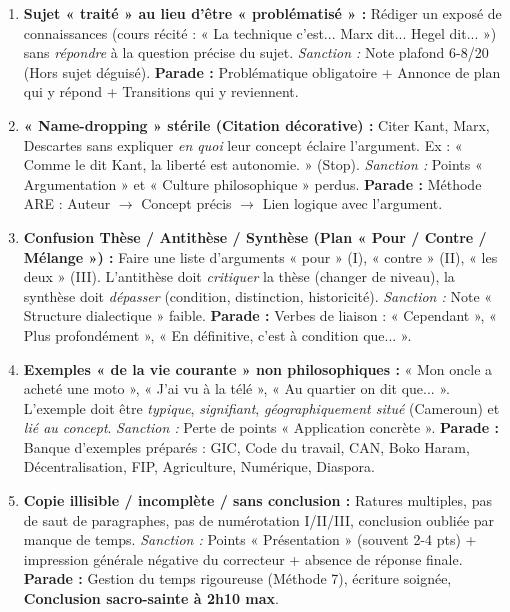 \documentclass[11pt]{article}
\begin{document}
\begin{attention}
\begin{enumerate}
    \item \textbf{Sujet « traité » au lieu d'être « problématisé » :} Rédiger un exposé de connaissances (cours récité : « La technique c'est... Marx dit... Hegel dit... ») sans \emph{répondre} à la question précise du sujet. \emph{Sanction :} Note plafond 6-8/20 (Hors sujet déguisé). \textbf{Parade :} Problématique obligatoire + Annonce de plan qui y répond + Transitions qui y reviennent.
    \item \textbf{« Name-dropping » stérile (Citation décorative) :} Citer Kant, Marx, Descartes sans expliquer \emph{en quoi} leur concept éclaire l'argument. Ex : « Comme le dit Kant, la liberté est autonomie. » (Stop). \emph{Sanction :} Points « Argumentation » et « Culture philosophique » perdus. \textbf{Parade :} Méthode ARE : Auteur $\rightarrow$ Concept précis $\rightarrow$ Lien logique avec l'argument.
    \item \textbf{Confusion Thèse / Antithèse / Synthèse (Plan « Pour / Contre / Mélange ») :} Faire une liste d'arguments « pour » (I), « contre » (II), « les deux » (III). L'antithèse doit \emph{critiquer} la thèse (changer de niveau), la synthèse doit \emph{dépasser} (condition, distinction, historicité). \emph{Sanction :} Note « Structure dialectique » faible. \textbf{Parade :} Verbes de liaison : « Cependant », « Plus profondément », « En définitive, c'est à condition que... ».
    \item \textbf{Exemples « de la vie courante » non philosophiques :} « Mon oncle a acheté une moto », « J'ai vu à la télé », « Au quartier on dit que... ». L'exemple doit être \emph{typique}, \emph{signifiant}, \emph{géographiquement situé} (Cameroun) et \emph{lié au concept}. \emph{Sanction :} Perte de points « Application concrète ». \textbf{Parade :} Banque d'exemples préparés : GIC, Code du travail, CAN, Boko Haram, Décentralisation, FIP, Agriculture, Numérique, Diaspora.
    \item \textbf{Copie illisible / incomplète / sans conclusion :} Ratures multiples, pas de saut de paragraphes, pas de numérotation I/II/III, conclusion oubliée par manque de temps. \emph{Sanction :} Points « Présentation » (souvent 2-4 pts) + impression générale négative du correcteur + absence de réponse finale. \textbf{Parade :} Gestion du temps rigoureuse (Méthode 7), écriture soignée, \textbf{Conclusion sacro-sainte à 2h10 max}.
\end{enumerate}
\end{attention}
\end{document}
